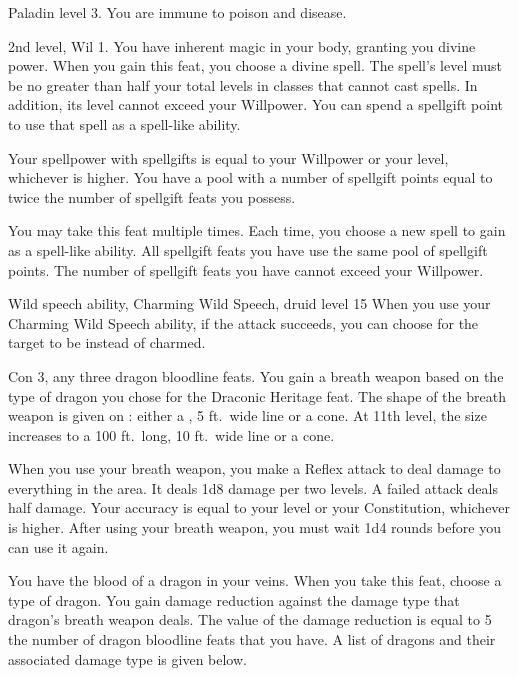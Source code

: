 \featpre Paladin level 3.
\featben You are immune to poison and disease.

\featpres 2nd level, Wil 1.
\featben You have inherent magic in your body, granting you divine power.
When you gain this feat, you choose a divine spell.
The spell's level must be no greater than half your total levels in classes that cannot cast spells.
In addition, its level cannot exceed your Willpower.
You can spend a spellgift point to use that spell as a spell-like ability.

Your spellpower with spellgifts is equal to your Willpower or your level, whichever is higher.
You have a pool with a number of spellgift points equal to twice the number of spellgift feats you possess.

You may take this feat multiple times.
Each time, you choose a new spell to gain as a spell-like ability.
All spellgift feats you have use the same pool of spellgift points.
The number of spellgift feats you have cannot exceed your Willpower.

\featpres Wild speech ability, Charming Wild Speech, druid level 15
\featben When you use your Charming Wild Speech ability, if the attack succeeds, you can choose for the target to be \dominated instead of charmed.

\featpres Con 3, any three dragon bloodline feats.
\featben You gain a breath weapon based on the type of dragon you chose for the Draconic Heritage feat.
The shape of the breath weapon is given on : either a \arealarge, 5 ft.\ wide line or a \areamed cone.
At 11th level, the size increases to a 100 ft.\ long, 10 ft.\ wide line or a \arealarge cone.

When you use your breath weapon, you make a Reflex attack to deal damage to everything in the area.
It deals 1d8 damage per two levels.
A failed attack deals half damage.
Your accuracy is equal to your level or your Constitution, whichever is higher.
After using your breath weapon, you must wait 1d4 rounds before you can use it again.

\featben You have the blood of a dragon in your veins.
When you take this feat, choose a type of dragon.
You gain damage reduction against the damage type that dragon's breath weapon deals.
The value of the damage reduction is equal to 5 \mtimes the number of dragon bloodline feats that you have.
A list of dragons and their associated damage type is given below.

